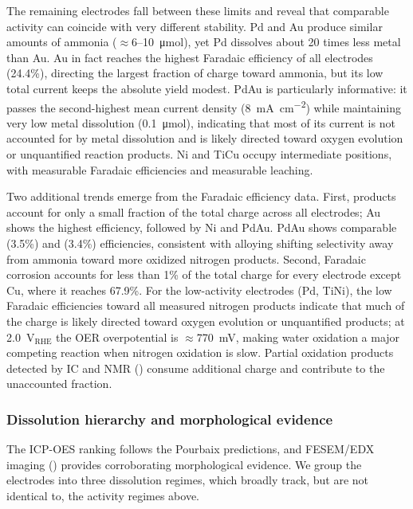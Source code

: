 \documentclass[twoside,twocolumn,9pt]{article}
\begin{document}
The remaining electrodes fall between these limits and reveal that comparable activity can coincide with very different stability. Pd and Au produce similar amounts of ammonia ($\approx$6--10~\si{\micro mol}), yet Pd dissolves about 20 times less metal than Au. Au in fact reaches the highest  Faradaic efficiency of all electrodes (24.4\%), directing the largest fraction of charge toward ammonia, but its low total current keeps the absolute yield modest. PdAu is particularly informative: it passes the second-highest mean current density (\SI{8}{\milli\ampere\per\square\centi\meter}) while maintaining very low metal dissolution (0.1~\si{\micro mol}), indicating that most of its current is not accounted for by metal dissolution and is likely directed toward oxygen evolution or unquantified reaction products. Ni and TiCu occupy intermediate positions, with measurable  Faradaic efficiencies and measurable leaching.

Two additional trends emerge from the Faradaic efficiency data. First,  products account for only a small fraction of the total charge across all electrodes; Au shows the highest  efficiency, followed by Ni and PdAu. PdAu shows comparable  (3.5\%) and  (3.4\%) efficiencies, consistent with alloying shifting selectivity away from ammonia toward more oxidized nitrogen products. Second, Faradaic corrosion accounts for less than 1\% of the total charge for every electrode except Cu, where it reaches 67.9\%. For the low-activity electrodes (Pd, TiNi), the low Faradaic efficiencies toward all measured nitrogen products indicate that much of the charge is likely directed toward oxygen evolution or unquantified products; at 2.0~V$_{\mathrm{RHE}}$ the OER overpotential is $\approx$770~mV, making water oxidation a major competing reaction when nitrogen oxidation is slow. Partial oxidation products detected by IC and NMR () consume additional charge and contribute to the unaccounted fraction.

\subsubsection{Dissolution hierarchy and morphological evidence}

The ICP-OES ranking follows the Pourbaix predictions, and FESEM/EDX imaging () provides corroborating morphological evidence. We group the electrodes into three dissolution regimes, which broadly track, but are not identical to, the activity regimes above.
\end{document}
